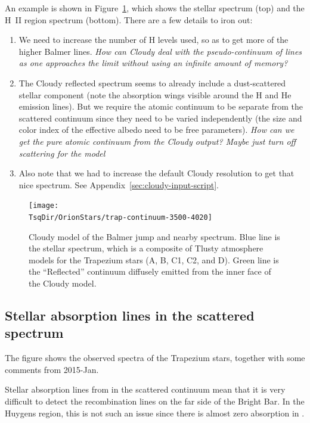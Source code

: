 \documentclass[preprint]{aastex}
\newcommand\TsqDir{/Users/will/Work/RubinWFC3/Tsquared}
\begin{document}
An example is shown in Figure~\ref{fig:balmer-jump-cloudy}, which
shows the stellar spectrum (top) and the H~II region spectrum
(bottom).  There are a few details to iron out:
\begin{enumerate}
\item We need to increase the number of H levels used, so as to get
  more of the higher Balmer lines. \textit{How can Cloudy deal with the
    pseudo-continuum of lines as one approaches the limit without
    using an infinite amount of memory?}
\item The Cloudy reflected spectrum seems to already include a
  dust-scattered stellar component (note the absorption wings visible
  around the H and He emission lines). But we require the atomic
  continuum to be separate from the scattered continuum since they
  need to be varied independently (the size and color index of the
  effective albedo need to be free parameters). \textit{How can we get
  the pure atomic continuum from the Cloudy output? Maybe just turn
  off scattering for the model}
\item Also note that we had to increase the default Cloudy resolution
  to get that nice spectrum.  See
  Appendix~\ref{sec:cloudy-input-script}.  
\end{enumerate}

\begin{figure}
  \texttt{[image: \\TsqDir/OrionStars/trap-continuum-3500-4020]}
  \caption{Cloudy model of the Balmer jump and nearby spectrum.  Blue
    line is the stellar spectrum, which is a composite of Tlusty
    atmosphere models for the Trapezium stars (A, B, C1, C2, and D).
    Green line is the ``Reflected'' continuum diffusely emitted from
    the inner face of the Cloudy model.}
  \label{fig:balmer-jump-cloudy}
\end{figure}


\clearpage
\subsection{Stellar absorption lines in the scattered spectrum}
\label{sec:stell-absorpt-lines}
The figure shows the observed spectra of the Trapezium stars, together
with some comments from 2015-Jan. 

Stellar  absorption lines from  in the scattered
continuum mean that it is very difficult to detect the 
recombination lines on the far side of the Bright Bar. In the Huygens
region, this is not such an issue since there is almost zero
 absorption in . 
\end{document}

